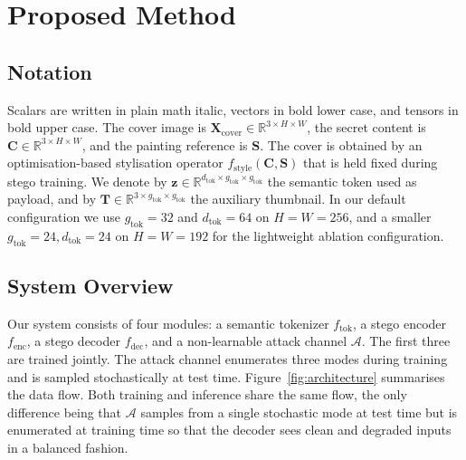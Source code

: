 \documentclass[runningheads]{llncs}
\begin{document}
\section{Proposed Method}
\label{sec:method}

\subsection{Notation}
Scalars are written in plain math italic, vectors in bold lower case, and tensors in bold upper case. The cover image is $\mathbf{X}_{\text{cover}}\!\in\!\mathbb{R}^{3\times H\times W}$, the secret content is $\mathbf{C}\!\in\!\mathbb{R}^{3\times H\times W}$, and the painting reference is $\mathbf{S}$. The cover is obtained by an optimisation-based stylisation operator $f_{\text{style}}(\mathbf{C},\mathbf{S})$ that is held fixed during stego training. We denote by $\mathbf{z}\!\in\!\mathbb{R}^{d_{\text{tok}}\times g_{\text{tok}}\times g_{\text{tok}}}$ the semantic token used as payload, and by $\mathbf{T}\!\in\!\mathbb{R}^{3\times g_{\text{tok}}\times g_{\text{tok}}}$ the auxiliary thumbnail. In our default configuration we use $g_{\text{tok}}=32$ and $d_{\text{tok}}=64$ on $H\!=\!W\!=\!256$, and a smaller $g_{\text{tok}}=24,d_{\text{tok}}=24$ on $H\!=\!W\!=\!192$ for the lightweight ablation configuration.

\subsection{System Overview}
Our system consists of four modules: a semantic tokenizer $f_{\text{tok}}$, a stego encoder $f_{\text{enc}}$, a stego decoder $f_{\text{dec}}$, and a non-learnable attack channel $\mathcal{A}$. The first three are trained jointly. The attack channel enumerates three modes during training and is sampled stochastically at test time. Figure~\ref{fig:architecture} summarises the data flow. Both training and inference share the same flow, the only difference being that $\mathcal{A}$ samples from a single stochastic mode at test time but is enumerated at training time so that the decoder sees clean and degraded inputs in a balanced fashion.
\end{document}
